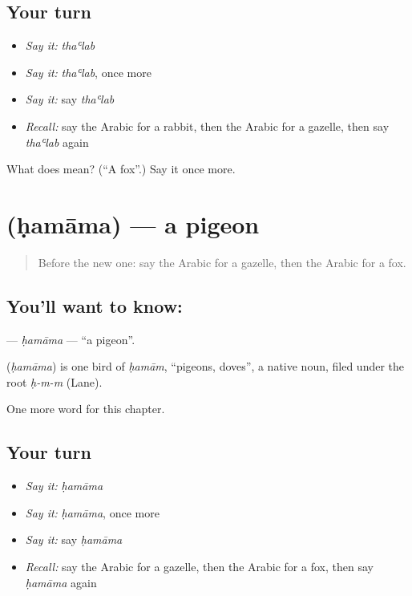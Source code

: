 \subsection*{Your turn}
\begin{itemize}
\raggedright
  \item \emph{Say it:} \emph{thaʿlab}
  \item \emph{Say it:} \emph{thaʿlab}, once more
  \item \emph{Say it:} say \emph{thaʿlab}
  \item \emph{Recall:} say the Arabic for a rabbit, then the Arabic for a gazelle, then say \emph{thaʿlab} again
\end{itemize}

\begin{tcolorbox}[breakable,colback=teal!4,colframe=teal!35!black,title={Before you move on}]
What does  mean? (\textquotedblleft{}A fox\textquotedblright{}.) Say it once more.
\end{tcolorbox}
\section[\texorpdfstring{\ar{حمامة} (ḥamāma)}{حمامة (ḥamāma)}]{ (ḥamāma) — a pigeon}

\label{lesson:AR-C135-hamama}



\begin{quote}
Before the new one: say the Arabic for a gazelle, then the Arabic for a fox.
\end{quote}

\subsection*{You'll want to know: }
\textbf{} — \emph{ḥamāma} — \textquotedblleft{}a pigeon\textquotedblright{}.

\begin{cousinweb}
\textbf{} (\emph{ḥamāma}) is one bird of \emph{ḥamām}, \textquotedblleft{}pigeons, doves\textquotedblright{}, a native noun, filed under the root \emph{ḥ-m-m} (Lane).
\end{cousinweb}

\begin{grammarlens}[title={What you've built}]
One more word for this chapter.
\end{grammarlens}

\subsection*{Your turn}
\begin{itemize}
\raggedright
  \item \emph{Say it:} \emph{ḥamāma}
  \item \emph{Say it:} \emph{ḥamāma}, once more
  \item \emph{Say it:} say \emph{ḥamāma}
  \item \emph{Recall:} say the Arabic for a gazelle, then the Arabic for a fox, then say \emph{ḥamāma} again
\end{itemize}

